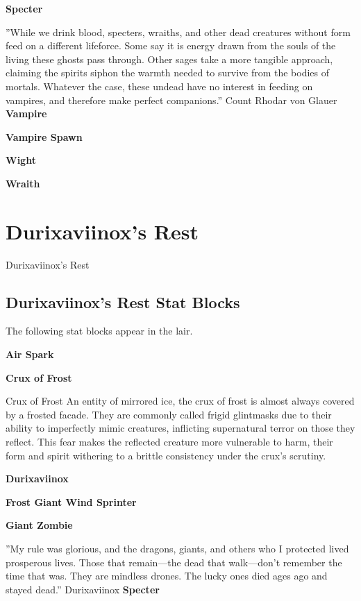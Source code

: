 \documentclass[10pt,a4paper,twoside,bg=print,twocolumn,openany,nodeprecatedcode]{dndbook}
\begin{document}
\textbf{Specter}

\DndQuote%
{}
{''While we drink blood, specters, wraiths, and other dead creatures without form feed on a different lifeforce. Some say it is energy drawn from the souls of the living these ghosts pass through. Other sages take a more tangible approach, claiming the spirits siphon the warmth needed to survive from the bodies of mortals. Whatever the case, these undead have no interest in feeding on vampires, and therefore make perfect companions.''}
{Count Rhodar von Glauer}
\textbf{Vampire}

\textbf{Vampire Spawn}

\textbf{Wight}

\textbf{Wraith}

\chapter{Durixaviinox's Rest}
Durixaviinox's Rest

\section{Durixaviinox's Rest Stat Blocks}
The following stat blocks appear in the lair.

\textbf{Air Spark}

\textbf{Crux of Frost}

\begin{DndSidebar}[float=!b]{Crux of Frost}
An entity of mirrored ice, the crux of frost is almost always covered by a frosted facade. They are commonly called frigid glintmasks due to their ability to imperfectly mimic creatures, inflicting supernatural terror on those they reflect. This fear makes the reflected creature more vulnerable to harm, their form and spirit withering to a brittle consistency under the crux's scrutiny.



\end{DndSidebar}

\textbf{Durixaviinox}

\textbf{Frost Giant Wind Sprinter}

\textbf{Giant Zombie}

\DndQuote%
{}
{''My rule was glorious, and the dragons, giants, and others who I protected lived prosperous lives. Those that remain—the dead that walk—don't remember the time that was. They are mindless drones. The lucky ones died ages ago and stayed dead.''}
{Durixaviinox}
\textbf{Specter}
\end{document}
